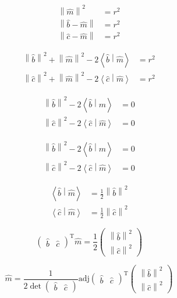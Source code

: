 \documentclass[10pt, twoside, fleqn]{article}
\newcommand{\norm}[1]{\left\| #1 \right\|}
\newcommand{\scalarproduct}[2]{\left\langle #1 \middle| #2 \right\rangle}
\begin{document}
        \begin{align*}
          \norm{\hat{m}}^2 &= r^2 \\
          \norm{\hat{b} - \hat{m}} &= r^2 \\
          \norm{\hat{c} - \hat{m}} &= r^2
        \end{align*}

        \begin{align*}
          \norm{\hat{b}}^2 + \norm{\hat{m}}^2 - 2 \scalarproduct{\hat{b}}{\hat{m}} &= r^2 \\
          \norm{\hat{c}}^2 + \norm{\hat{m}}^2 - 2 \scalarproduct{\hat{c}}{\hat{m}} &= r^2
        \end{align*}

        \begin{align*}
          \norm{\hat{b}}^2 - 2 \scalarproduct{\hat{b}}{\hat{m}} &= 0 \\
          \norm{\hat{c}}^2 - 2 \scalarproduct{\hat{c}}{\hat{m}} &= 0
        \end{align*}

        \begin{align*}
          \norm{\hat{b}}^2 - 2 \scalarproduct{\hat{b}}{\hat{m}} &= 0 \\
          \norm{\hat{c}}^2 - 2 \scalarproduct{\hat{c}}{\hat{m}} &= 0
        \end{align*}

        \begin{align*}
          \scalarproduct{\hat{b}}{\hat{m}} &= \frac{1}{2}\norm{\hat{b}}^2 \\
          \scalarproduct{\hat{c}}{\hat{m}} &= \frac{1}{2}\norm{\hat{c}}^2
        \end{align*}

        \[
          \begin{pmatrix}
            \hat{b} & \hat{c}
          \end{pmatrix}
          ^\mathrm{T}
          \hat{m}
          = \frac{1}{2}
          \begin{pmatrix}
            \norm{\hat{b}}^2 \\
            \norm{\hat{c}}^2
          \end{pmatrix}
        \]

        \[
          \hat{m} =
          \frac{1}{2\det\begin{pmatrix}\hat{b} & \hat{c}\end{pmatrix}}
          \mathrm{adj} \begin{pmatrix}\hat{b} & \hat{c}\end{pmatrix}^\mathrm{T}
          \begin{pmatrix}
            \norm{\hat{b}}^2 \\
            \norm{\hat{c}}^2
          \end{pmatrix}
        \]
\end{document}
